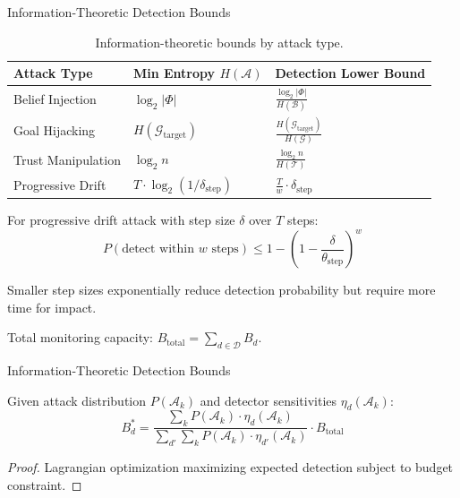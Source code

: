 \documentclass[
  ignorenonframetext,
]{beamer}
\begin{document}
\begin{frame}[allowframebreaks]{Information-Theoretic Detection Bounds}
\begin{table}[htbp]
\centering
\caption{Information-theoretic bounds by attack type.}
\label{tab:attack-bounds}
\begin{tabular}{@{}lll@{}}
\toprule
Attack Type & Min Entropy $H(\mathcal{A})$ & Detection Lower Bound \\
\midrule
Belief Injection & $\log_2 |\Phi|$ & $\frac{\log_2 |\Phi|}{H(\mathcal{B})}$ \\
Goal Hijacking & $H(\mathcal{G}_{\text{target}})$ & $\frac{H(\mathcal{G}_{\text{target}})}{H(\mathcal{G})}$ \\
Trust Manipulation & $\log_2 n$ & $\frac{\log_2 n}{H(\mathcal{T})}$ \\
Progressive Drift & $T \cdot \log_2(1/\delta_{\text{step}})$ & $\frac{T}{w} \cdot \delta_{\text{step}}$ \\
\bottomrule
\end{tabular}
\end{table}

\begin{theorem}
\label{thm:progressive-detection}
For progressive drift attack with step size $\delta$ over $T$ steps:
\begin{equation}
\label{eq:progressive-bound}
P(\text{detect within } w \text{ steps}) \leq 1 - \left(1 - \frac{\delta}{\theta_{\text{step}}}\right)^{w}
\end{equation}
\end{theorem}

\begin{corollary}
\label{cor:small-steps}
Smaller step sizes exponentially reduce detection probability but require more time for impact.
\end{corollary}

\begin{definition}
\label{def:defense-budget}
Total monitoring capacity: $B_{\text{total}} = \sum_{d \in \mathcal{D}} B_d$.
\end{definition}

\end{frame}

\begin{frame}[allowframebreaks]{Information-Theoretic Detection Bounds}
\begin{theorem}
\label{thm:optimal-allocation}
Given attack distribution $P(\mathcal{A}_k)$ and detector sensitivities $\eta_d(\mathcal{A}_k)$:
\begin{equation}
\label{eq:optimal-allocation}
B_d^* = \frac{\sum_k P(\mathcal{A}_k) \cdot \eta_d(\mathcal{A}_k)}{\sum_{d'}\sum_k P(\mathcal{A}_k) \cdot \eta_{d'}(\mathcal{A}_k)} \cdot B_{\text{total}}
\end{equation}
\end{theorem}

\begin{proof}
Lagrangian optimization maximizing expected detection subject to budget constraint.
\end{proof}

\end{frame}
\end{document}
